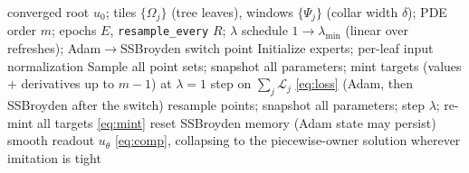 \documentclass[11pt]{article}
\begin{document}
\begin{algorithm}[H]
\caption{Owner--imitator training of AToE experts (fine-tune excluded)}
\begin{algorithmic}[1]
\Require converged root $u_0$; tiles $\{\Omega_j\}$ (tree leaves),
windows $\{\Psi_j\}$ (collar width $\delta$); PDE order $m$; epochs $E$,
\texttt{resample\_every} $R$; $\lambda$ schedule $1 \to \lambda_{\min}$
(linear over refreshes); Adam$\to$SSBroyden switch point
\State Initialize experts; per-leaf input normalization
\State Sample all point sets; snapshot all parameters; mint targets
(values $+$ derivatives up to $m-1$) at $\lambda = 1$
 
  \State step on $\sum_j \mathcal L_j$ \eqref{eq:loss}
  (Adam, then SSBroyden after the switch)
    \State resample points; snapshot all parameters; step $\lambda$;
    re-mint all targets \eqref{eq:mint}
    \State reset SSBroyden memory (Adam state may persist)
  \EndIf
\EndFor
\Ensure smooth readout $u_\theta$ \eqref{eq:comp}, collapsing to the
piecewise-owner solution wherever imitation is tight
\end{algorithmic}
\end{algorithm}
\end{document}

